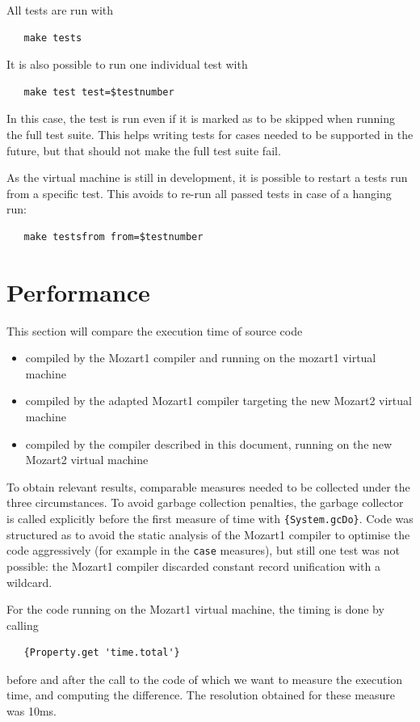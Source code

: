 \documentclass[a4paper]{memoir}
\begin{document}
All tests are run with 
\begin{lstlisting}
   make tests
\end{lstlisting}
It is also possible to run one individual test with
\begin{lstlisting}
   make test test=$testnumber
\end{lstlisting}
In this case, the test is run
even if it is marked as to be skipped when running the full test suite. This helps writing tests for cases needed to be supported in the future, but that should not make the full test suite fail.

As the virtual machine is still in development, it is possible to restart a
tests run from a specific test. This avoids to re-run all passed tests in case
of a hanging run:
\begin{lstlisting}
   make testsfrom from=$testnumber
\end{lstlisting}

\section{Performance}
This section will compare the execution time of source code
\begin{itemize}
  \item compiled by the Mozart1 compiler and running on the mozart1 virtual
    machine 
  \item compiled by the adapted Mozart1 compiler targeting the new Mozart2 virtual
    machine
  \item compiled by the compiler described in this document, running on the new
    Mozart2 virtual machine
\end{itemize}

To obtain relevant results, comparable measures needed to be collected under the
three circumstances.
To avoid garbage collection penalties, the garbage collector is called explicitly before the
first measure of time with \lstinline!{System.gcDo}!.
Code was structured as to avoid the static analysis of the Mozart1 compiler to
optimise the code aggressively (for example in the \lstinline!case! measures), but still
one test was not possible: the Mozart1 compiler discarded constant record unification with a wildcard.

For the code running on the Mozart1 virtual machine, the timing is done by
calling 
\begin{lstlisting}
   {Property.get 'time.total'}
\end{lstlisting}
before and after the call to the code of which we want to measure the execution
time, and computing the difference. The resolution obtained for these measure was 10ms.
\end{document}
